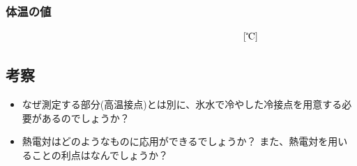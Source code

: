 \subsubsection*{体温の値}
\[
\hspace*{5cm}\text{[℃]}
\]

\newpage

\subsection*{考察}

\begin{itemize}

\item なぜ測定する部分(高温接点)とは別に、氷水で冷やした冷接点を用意する必要があるのでしょうか？

\vspace{6cm}

\item 熱電対はどのようなものに応用ができるでしょうか？ また、熱電対を用いることの利点はなんでしょうか？

\end{itemize}


